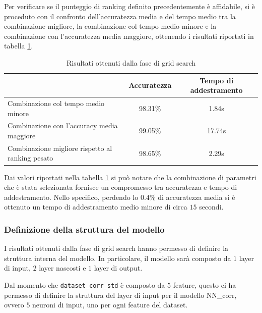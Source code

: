 Per verificare se il punteggio di ranking definito precedentemente è affidabile,
si è proceduto con il confronto dell'accuratezza media e del tempo medio tra la combinazione
migliore, la combinazione col tempo medio minore e la combinazione con l'accuratezza
media maggiore, ottenendo i risultati riportati in tabella \ref{tab:ris-grid-search}.
\begin{table}[ht]
    \centering
    \begin{tabular}{@{}lcc@{}}
        \toprule
        \rowcolor[HTML]{EFEFEF}
        \multicolumn{1}{c}{\cellcolor[HTML]{EFEFEF}\textbf{Combinazione di parametri}} & \textbf{Accuratezza} & \textbf{Tempo di addestramento} \\ \midrule
        Combinazione col tempo medio minore                                            & 98.31\%               & 1.84s                           \\
        Combinazione con l'accuracy media maggiore                                     & 99.05\%               & 17.74s                          \\
        Combinazione migliore rispetto al ranking pesato                               & 98.65\%               & 2.29s                           \\ \bottomrule
    \end{tabular}
    \caption{Risultati ottenuti dalla fase di grid search}
    \label{tab:ris-grid-search}
\end{table}

Dai valori riportati nella tabella \ref{tab:ris-grid-search} si può notare che
la combinazione di parametri  che è stata selezionata fornisce un compromesso tra
accuratezza e tempo di addestramento. Nello specifico, perdendo lo $0.4\%$ di
accuratezza media si è ottenuto un tempo di addestramento medio minore di circa $15$ secondi.

\subsubsection{Definizione della struttura del modello}

I risultati ottenuti dalla fase di grid search hanno permesso di definire la
struttura interna del modello. In particolare, il modello sarà composto da $1$
layer di input, $2$ layer nascosti e $1$ layer di output.

Dal momento che \texttt{dataset\_corr\_std} è composto da $5$ feature, questo ci ha permesso
di definire la struttura del layer di input per il modello NN\_corr, ovvero
$5$ neuroni di input, uno per ogni feature del dataset.

